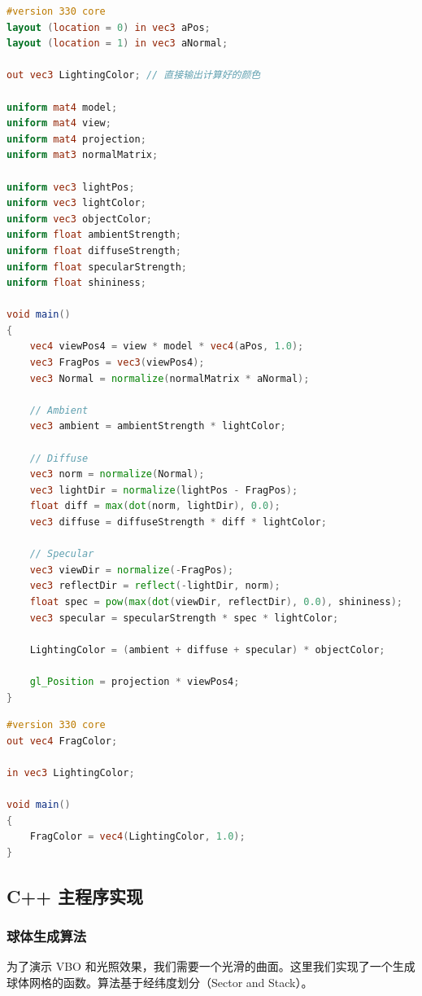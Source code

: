 \documentclass[a4paper]{article}
\begin{document}
\begin{lstlisting}[language=GLSL, caption={gouraud.vert}]
#version 330 core
layout (location = 0) in vec3 aPos;
layout (location = 1) in vec3 aNormal;

out vec3 LightingColor; // 直接输出计算好的颜色

uniform mat4 model;
uniform mat4 view;
uniform mat4 projection;
uniform mat3 normalMatrix;

uniform vec3 lightPos;
uniform vec3 lightColor;
uniform vec3 objectColor;
uniform float ambientStrength;
uniform float diffuseStrength;
uniform float specularStrength;
uniform float shininess;

void main()
{
    vec4 viewPos4 = view * model * vec4(aPos, 1.0);
    vec3 FragPos = vec3(viewPos4);
    vec3 Normal = normalize(normalMatrix * aNormal);
    
    // Ambient
    vec3 ambient = ambientStrength * lightColor;
  
    // Diffuse
    vec3 norm = normalize(Normal);
    vec3 lightDir = normalize(lightPos - FragPos);
    float diff = max(dot(norm, lightDir), 0.0);
    vec3 diffuse = diffuseStrength * diff * lightColor;
    
    // Specular
    vec3 viewDir = normalize(-FragPos); 
    vec3 reflectDir = reflect(-lightDir, norm);  
    float spec = pow(max(dot(viewDir, reflectDir), 0.0), shininess);
    vec3 specular = specularStrength * spec * lightColor;  
        
    LightingColor = (ambient + diffuse + specular) * objectColor;
    
    gl_Position = projection * viewPos4;
}
\end{lstlisting}

\begin{lstlisting}[language=GLSL, caption={gouraud.frag}]
#version 330 core
out vec4 FragColor;

in vec3 LightingColor;

void main()
{
    FragColor = vec4(LightingColor, 1.0);
}
\end{lstlisting}

\subsection{C++ 主程序实现}

\subsubsection{球体生成算法}
为了演示 VBO 和光照效果，我们需要一个光滑的曲面。这里我们实现了一个生成球体网格的函数。算法基于经纬度划分（Sector and Stack）。
\end{document}
